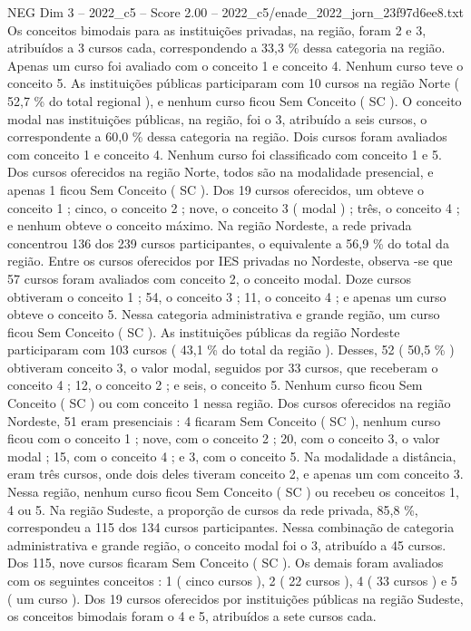 \begin{textsample}{NEG Dim 3 – 2022\_c5 – Score 2.00 – 2022\_c5/enade\_2022\_jorn\_23f97d6ee8.txt}
Os conceitos bimodais para as instituições privadas, na região, foram 2 e 3, atribuídos a 3 cursos cada, correspondendo a 33,3 \% dessa categoria na região.
Apenas um curso foi avaliado com o conceito 1 e conceito 4.
Nenhum curso teve o conceito 5.
As instituições públicas participaram com 10 cursos na região Norte ( 52,7 \% do total regional ), e nenhum curso ficou Sem Conceito ( SC ).
O conceito modal nas instituições públicas, na região, foi o 3, atribuído a seis cursos, o correspondente a 60,0 \% dessa categoria na região.
Dois cursos foram avaliados com conceito 1 e conceito 4.
Nenhum curso foi classificado com conceito 1 e 5.
Dos cursos oferecidos na região Norte, todos são na modalidade presencial, e apenas 1 ficou Sem Conceito ( SC ).
Dos 19 cursos oferecidos, um obteve o conceito 1 ; cinco, o conceito 2 ; nove, o conceito 3 ( modal ) ; três, o conceito 4 ; e nenhum obteve o conceito máximo.
Na região Nordeste, a rede privada concentrou 136 dos 239 cursos participantes, o equivalente a 56,9 \% do total da região.
Entre os cursos oferecidos por IES privadas no Nordeste, observa -se que 57 cursos foram avaliados com conceito 2, o conceito modal.
Doze cursos obtiveram o conceito 1 ; 54, o conceito 3 ; 11, o conceito 4 ; e apenas um curso obteve o conceito 5.
Nessa categoria administrativa e grande região, um curso ficou Sem Conceito ( SC ).
As instituições públicas da região Nordeste participaram com 103 cursos ( 43,1 \% do total da região ).
Desses, 52 ( 50,5 \% ) obtiveram conceito 3, o valor modal, seguidos por 33 cursos, que receberam o conceito 4 ; 12, o conceito 2 ; e seis, o conceito 5.
Nenhum curso ficou Sem Conceito ( SC ) ou com conceito 1 nessa região.
Dos cursos oferecidos na região Nordeste, 51 eram presenciais : 4 ficaram Sem Conceito ( SC ), nenhum curso ficou com o conceito 1 ; nove, com o conceito 2 ; 20, com o conceito 3, o valor modal ; 15, com o conceito 4 ; e 3, com o conceito 5.
Na modalidade a distância, eram três cursos, onde dois deles tiveram conceito 2, e apenas um com conceito 3.
Nessa região, nenhum curso ficou Sem Conceito ( SC ) ou recebeu os conceitos 1, 4 ou 5.
Na região Sudeste, a proporção de cursos da rede privada, 85,8 \%, correspondeu a 115 dos 134 cursos participantes.
Nessa combinação de categoria administrativa e grande região, o conceito modal foi o 3, atribuído a 45 cursos.
Dos 115, nove cursos ficaram Sem Conceito ( SC ).
Os demais foram avaliados com os seguintes conceitos : 1 ( cinco cursos ), 2 ( 22 cursos ), 4 ( 33 cursos ) e 5 ( um curso ).
Dos 19 cursos oferecidos por instituições públicas na região Sudeste, os conceitos bimodais foram o 4 e 5, atribuídos a sete cursos cada.

\end{textsample}
